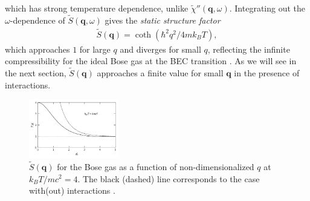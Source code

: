 \documentclass[prl,
twocolumn,
nofootinbib,
amsmath,amssymb,
aps]{revtex4-1}
\begin{document}
which has strong temperature dependence, unlike $\widetilde{\chi}''(\mathbf{q},\omega)$.  Integrating out the $\omega$-dependence of $\widetilde{S}(\mathbf{q},\omega)$ gives the \textit{static structure factor}
\begin{align*}
\widetilde{S}(\mathbf{q}) = \coth (\hbar^2 q^2 / 4mk_BT),
\end{align*}
which approaches $1$ for large $q$ and diverges for small $q$, reflecting the infinite compressibility for the ideal Bose gas at the BEC transition \cite{kardar2007statistical}. As we will see in the next section, $\widetilde{S}(\mathbf{q})$ approaches a finite value for small $\mathbf{q}$ in the presence of interactions. 

\begin{figure}[!htb]
\centering
\includegraphics[width=0.35\textwidth]{figures/ideal.png}
\caption{\label{fig:ideal} $\widetilde{S}(\mathbf{q})$ for the Bose gas as a function of non-dimensionalized $q$ at $k_BT / mc^2 = 4$. The black (dashed) line corresponds to the case with(out) interactions \cite{pitaevskii2016bose}.}
\end{figure}
\end{document}
